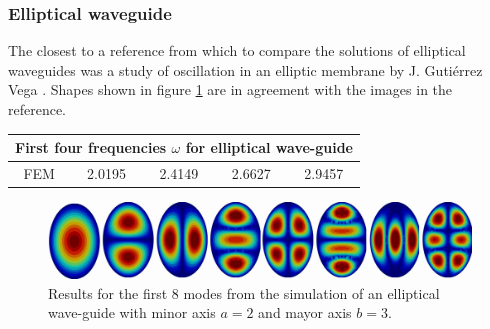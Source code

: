 \subsubsection{Elliptical waveguide}

The closest to a reference from which to compare the solutions of elliptical waveguides was a study of oscillation in an elliptic membrane by J. Guti\'errez Vega \cite{J.Gutierrez-Vega1999}. Shapes shown in figure \ref{fig:elliptical_waveguide} are in agreement with the images in the reference. 

\begin{center}
\begin{tabular}{|c|c|c|c|c|}
\hline
\multicolumn{5}{|c|}{First four frequencies $\omega$ for elliptical wave-guide} \\
\hline 
FEM     & 2.0195 & 2.4149 & 2.6627 & 2.9457 \\ 
\hline 
\end{tabular} 
\label{tab:eli_wav_comparison}
\end{center}
\begin{figure}
\centering
\includegraphics[scale=0.1]{./img/elliptical_waveguide.pdf}
\caption{Results for the first 8 modes from the simulation of an elliptical wave-guide with minor axis $a=2$ and mayor axis $b=3$.}
\label{fig:elliptical_waveguide}
\end{figure}

